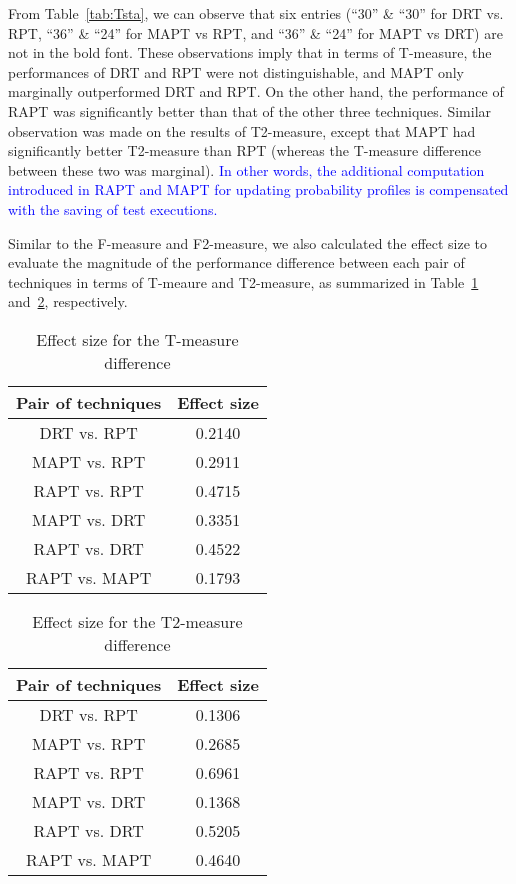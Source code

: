 \documentclass[10pt,journal,compsoc]{IEEEtran}
\begin{document}
From Table~\ref{tab:Tsta}, we can observe that six entries (``30'' \& ``30'' for DRT vs. RPT, ``36'' \& ``24'' for MAPT vs RPT, and ``36'' \& ``24'' for MAPT vs DRT) are not in the bold font. These observations imply that in terms of T-measure, the performances of DRT and RPT were not distinguishable, and MAPT only marginally outperformed DRT and RPT. On the other hand, the performance of RAPT was significantly better than that of the other three techniques. Similar observation was made on the results of T2-measure, except that MAPT had significantly better T2-measure than RPT (whereas the T-measure difference between these two was marginal). \textcolor{blue}{In other words, the additional computation introduced in RAPT and MAPT for updating probability profiles is compensated with the saving of test executions.}

Similar to the F-measure and F2-measure, we also calculated the effect size to evaluate the magnitude of the performance difference between each pair of techniques in terms of T-meaure and T2-measure, as summarized in Table~\ref{tab:Teffect} and~\ref{tab:T2effect}, respectively.

\begin{table}
\caption{Effect size for the T-measure difference}
\label{tab:Teffect}
\centering
\begin{tabular}{|c|c|} \hline
Pair of techniques	& Effect size	\\ \hline
DRT vs. RPT					& 0.2140			\\ \hline
MAPT vs. RPT				& 0.2911			\\ \hline
RAPT vs. RPT				& 0.4715			\\ \hline
MAPT vs. DRT				& 0.3351			\\ \hline
RAPT vs. DRT				& 0.4522			\\ \hline
RAPT vs. MAPT				& 0.1793			\\ \hline
\end{tabular}
\end{table}

\begin{table}
\caption{Effect size for the T2-measure difference}
\label{tab:T2effect}
\centering
\begin{tabular}{|c|c|} \hline
Pair of techniques	& Effect size	\\ \hline
DRT vs. RPT					& 0.1306			\\ \hline
MAPT vs. RPT				& 0.2685			\\ \hline
RAPT vs. RPT				& 0.6961			\\ \hline
MAPT vs. DRT				& 0.1368			\\ \hline
RAPT vs. DRT				& 0.5205			\\ \hline
RAPT vs. MAPT				& 0.4640			\\ \hline
\end{tabular}
\end{table}
\end{document}
